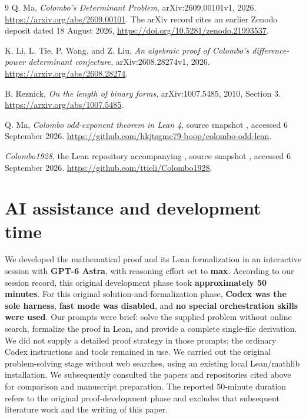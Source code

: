 \documentclass[11pt,a4paper]{article}
\numberwithin{equation}{section}
\theoremstyle{remark}
\newcommand{\lean}[1]{\texttt{\detokenize{#1}}}
\begin{document}
\begin{thebibliography}{9}
\small
{}
Q. Ma, \emph{Colombo's Determinant Problem}, arXiv:2609.00101v1, 2026.
\url{https://arxiv.org/abs/2609.00101}.
The arXiv record cites an earlier Zenodo deposit dated 18 August 2026,
\url{https://doi.org/10.5281/zenodo.21993537}.

K. Li, L. Tie, P. Wang, and Z. Liu,
\emph{An algebraic proof of Colombo's difference-power determinant conjecture},
arXiv:2608.28274v1, 2026.
\url{https://arxiv.org/abs/2608.28274}.

B. Reznick, \emph{On the length of binary forms},
arXiv:1007.5485, 2010, Section 3.
\url{https://arxiv.org/abs/1007.5485}.

Q. Ma, \emph{Colombo odd-exponent theorem in Lean 4},
source snapshot \lean{9f57b40c7c}, accessed 6 September 2026.
\url{https://github.com/hkjtsgmc79-boop/colombo-odd-lean}.

\emph{Colombo1928}, the Lean repository accompanying \cite{Li},
source snapshot \lean{b98c9e55c9}, accessed 6 September 2026.
\url{https://github.com/ttieli/Colombo1928}.
\end{thebibliography}

\section*{AI assistance and development time}

We developed the mathematical proof and its Lean formalization in an
interactive session with \textbf{GPT-6 Astra}, with reasoning effort set to
\textbf{max}. According to our session record, this original development
phase took \textbf{approximately 50 minutes}.
For this original solution-and-formalization phase, \textbf{Codex was the
sole harness}, \textbf{fast mode was disabled}, and \textbf{no special
orchestration skills were used}.
Our prompts were brief: solve the supplied problem without
online search, formalize the proof in Lean, and provide a complete
single-file derivation. We did not supply a detailed proof strategy in
those prompts; the ordinary Codex instructions and tools remained in use.
We carried out the original problem-solving stage without web searches,
using an existing local Lean/mathlib installation. We subsequently
consulted the papers and repositories cited above for comparison and
manuscript preparation. The reported
50-minute duration refers to the original proof-development phase and
excludes that subsequent literature work and the writing of this paper.
\end{document}
